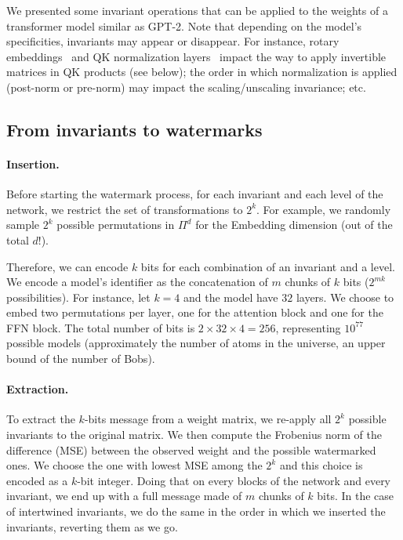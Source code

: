 We presented some invariant operations that can be applied to the weights of a transformer model similar as GPT-2. 
Note that depending on the model's specificities, invariants may appear or disappear. 
For instance, rotary embeddings~\citep{su2021roformer} and QK normalization layers~\citep{dehghani2023scaling} impact the way to apply invertible matrices in QK products (see below); the order in which normalization is applied (post-norm or pre-norm) may impact the scaling/unscaling invariance; etc.








\subsection{From invariants to watermarks}\label{chap7/sec:invariantsaswatermarks}

\paragraph*{Insertion.}
Before starting the watermark process, for each invariant and each level of the network, we restrict the set of transformations to $2^k$.
For example, we randomly sample $2^k$ possible permutations in $\Pi^d$ for the Embedding dimension (out of the total $d!$). 

Therefore, we can encode $k$ bits for each combination of an invariant and a level. 
We encode a model's identifier as the concatenation of $m$ chunks of $k$ bits ($2^{mk}$ possibilities).
For instance, let $k=4$ and the model have $32$ layers. 
We choose to embed two permutations per layer, one for the attention block and one for the FFN block. 
The total number of bits is $2\times 32\times 4=256$, representing $10^{77}$ possible models (approximately the number of atoms in the universe, an upper bound of the number of Bobs). 

\paragraph*{Extraction.}
To extract the $k$-bits message from a weight matrix, we re-apply all $2^k$ possible invariants to the original matrix.
We then compute the Frobenius norm of the difference (MSE) between the observed weight and the possible watermarked ones.
We choose the one with lowest MSE among the $2^k$ and this choice is encoded as a $k$-bit integer.
Doing that on every blocks of the network and every invariant, we end up with a full message made of $m$ chunks of $k$ bits.
In the case of intertwined invariants, we do the same in the order in which we inserted the invariants, reverting them as we go.

